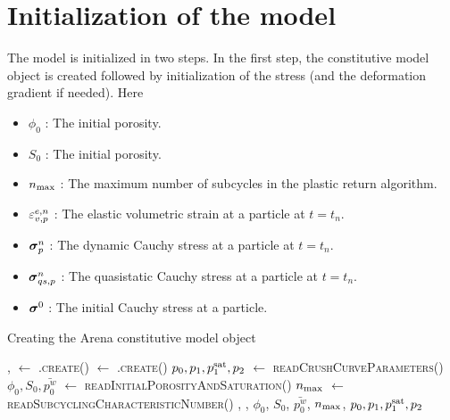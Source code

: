 \section{Initialization of the model}
The model is initialized in two steps.  In the first step, the constitutive model object is created
followed by initialization of the stress (and the deformation gradient if needed). Here
\begin{itemize} 
  \setlength\itemsep{1pt}
  \item $\phi_0$ : {\Ochre The initial porosity.}
  \item $S_0$ : {\Ochre The initial porosity.}
  \item $n_{\text{max}}$ : {\Ochre The maximum number of subcycles in the plastic return algorithm.}
  \item $\varepsilon^{e,n}_{v,p}$ : {\Ochre The elastic volumetric strain at a particle at $t = t_n$.}
  \item $\boldsymbol{\sigma}^{n}_{p}$ : {\Ochre The dynamic Cauchy stress at a particle at $t = t_n$.}
  \item $\boldsymbol{\sigma}^{n}_{qs,p}$ : {\Ochre The quasistatic Cauchy stress at a particle at $t = t_n$.}
  \item $\boldsymbol{\sigma}^{0}$ : {\Ochre The initial Cauchy stress at a particle.}
\end{itemize}
\begin{breakablealgorithm}
  \caption{Creating the Arena constitutive model object}
  \begin{algorithmic}[1]
    \Require {}, 
      \State {} $\leftarrow$ 
        .\textsc{create}()
      \State {} $\leftarrow$ 
        .\textsc{create}()
      \State $p_0, p_1, p_1^{\text{sat}}, p_2$ $\leftarrow$ \textsc{readCrushCurveParameters}()
      \State $\phi_0, S_0, \bar{p^w_0}$ $\leftarrow$ \textsc{readInitialPorosityAndSaturation}()
      \State $n_{\text{max}}$ $\leftarrow$ \textsc{readSubcyclingCharacteristicNumber}()
      \State \Return {}, , $\phi_0$, $S_0$, $\bar{p^w_0}$, $n_{\text{max}}$, 
        $p_0, p_1, p_1^{\text{sat}}, p_2$
    \EndProcedure
  \end{algorithmic}
\end{breakablealgorithm}

